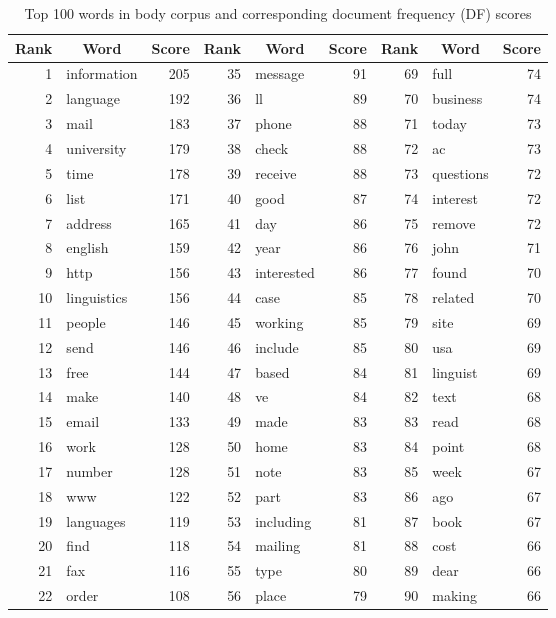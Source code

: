 \documentclass[10pt, a4paper]{article}
\begin{document}
\begin{table}[H]
\centering
\caption{Top 100 words in body corpus and corresponding document frequency (DF) scores}\vspace{1em}
\begin{tabular}{@{}rlrrlrrlr@{}}
\toprule
\textbf{Rank} & \multicolumn{1}{c}{\textbf{Word}} & \textbf{Score}
	& \textbf{Rank} & \multicolumn{1}{c}{\textbf{Word}} & \textbf{Score}
	& \textbf{Rank} & \multicolumn{1}{c}{\textbf{Word}} & \textbf{Score}\\
\midrule
1 & information & 205 & 35 & message & 91 & 69 & full & 74 \\
2 & language & 192 & 36 & ll & 89 & 70 & business & 74 \\
3 & mail & 183 & 37 & phone & 88 & 71 & today & 73 \\
4 & university & 179 & 38 & check & 88 & 72 & ac & 73 \\
5 & time & 178 & 39 & receive & 88 & 73 & questions & 72 \\
6 & list & 171 & 40 & good & 87 & 74 & interest & 72 \\
7 & address & 165 & 41 & day & 86 & 75 & remove & 72 \\
8 & english & 159 & 42 & year & 86 & 76 & john & 71 \\
9 & http & 156 & 43 & interested & 86 & 77 & found & 70 \\
10 & linguistics & 156 & 44 & case & 85 & 78 & related & 70 \\
11 & people & 146 & 45 & working & 85 & 79 & site & 69 \\
12 & send & 146 & 46 & include & 85 & 80 & usa & 69 \\
13 & free & 144 & 47 & based & 84 & 81 & linguist & 69 \\
14 & make & 140 & 48 & ve & 84 & 82 & text & 68 \\
15 & email & 133 & 49 & made & 83 & 83 & read & 68 \\
16 & work & 128 & 50 & home & 83 & 84 & point & 68 \\
17 & number & 128 & 51 & note & 83 & 85 & week & 67 \\
18 & www & 122 & 52 & part & 83 & 86 & ago & 67 \\
19 & languages & 119 & 53 & including & 81 & 87 & book & 67 \\
20 & find & 118 & 54 & mailing & 81 & 88 & cost & 66 \\
21 & fax & 116 & 55 & type & 80 & 89 & dear & 66 \\
22 & order & 108 & 56 & place & 79 & 90 & making & 66 \\

\end{tabular}
\end{table}
\end{document}
